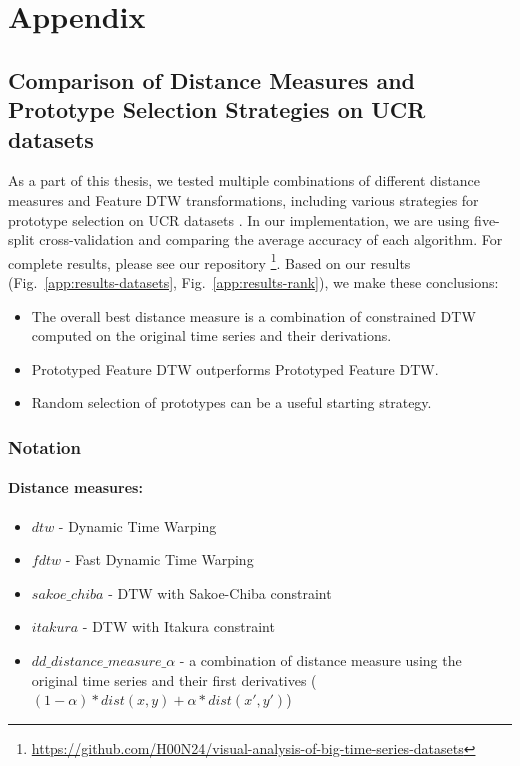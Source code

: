 \appendix %
\chapter{Appendix}

\section{Comparison of Distance Measures and Prototype Selection Strategies on UCR datasets}
\label{sec:app-ucr}

As a part of this thesis, we tested multiple combinations of different distance measures and Feature DTW transformations, including various strategies for prototype selection on UCR datasets \cite{exp:UCRArchive2018}. In our implementation, we are using five-split cross-validation and comparing the average accuracy of each algorithm. For complete results, please see our repository \footnote{\url{https://github.com/H00N24/visual-analysis-of-big-time-series-datasets}}. Based on our results (Fig.~\ref{app:results-datasets}, Fig.~\ref{app:results-rank}), we make these conclusions:
\begin{itemize}
    \item The overall best distance measure is a combination of constrained DTW computed on the original time series and their derivations.
    \item Prototyped Feature DTW outperforms Prototyped Feature DTW.
    \item Random selection of prototypes can be a useful starting strategy.
\end{itemize}

\subsection*{Notation}
\subsubsection*{Distance measures:}
\begin{itemize}
    \item $dtw$ - Dynamic Time Warping \cite{met:dtw}
    \item $fdtw$ - Fast Dynamic Time Warping \cite{met:FastDTW}
    \item $sakoe\_chiba$ - DTW with Sakoe-Chiba constraint \cite{met:dtw-window}
    \item $itakura$ - DTW with Itakura constraint \cite{met:dtw-itakura}
    \item $dd\_distance\_measure\_\alpha$ - a combination of distance measure using the  original time series and their first derivatives ($ (1 - \alpha) * dist(x, y) + \alpha * dist(x', y') $) \cite{met:fDTW}
\end{itemize}
